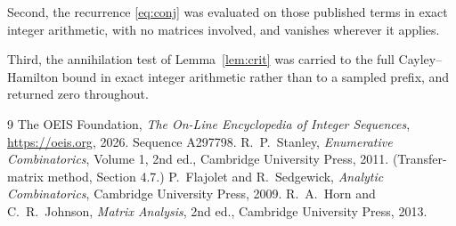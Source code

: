 \documentclass[11pt,a4paper]{article}
\theoremstyle{plain}
\theoremstyle{definition}
\begin{document}
Second, the recurrence \eqref{eq:conj} was evaluated on those published terms in exact
integer arithmetic, with no matrices involved, and vanishes wherever it applies.

Third, the annihilation test of Lemma~\ref{lem:crit} was carried to the full
Cayley--Hamilton bound in exact integer arithmetic rather than to a sampled prefix, and
returned zero throughout.

\begin{thebibliography}{9}
 The OEIS Foundation, \emph{The On-Line Encyclopedia of Integer
Sequences}, \url{https://oeis.org}, 2026. Sequence A297798.
 R.~P.~Stanley, \emph{Enumerative Combinatorics}, Volume 1, 2nd ed.,
Cambridge University Press, 2011. (Transfer-matrix method, Section 4.7.)
 P.~Flajolet and R.~Sedgewick, \emph{Analytic Combinatorics}, Cambridge
University Press, 2009.
 R.~A.~Horn and C.~R.~Johnson, \emph{Matrix Analysis}, 2nd ed., Cambridge
University Press, 2013.
\end{thebibliography}
\end{document}
